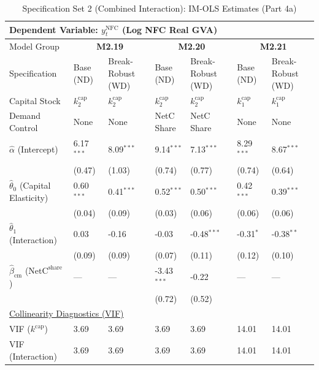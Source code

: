 \begin{table}[H]
\centering
\caption{Specification Set 2 (Combined Interaction): IM-OLS Estimates (Part 4a)}
\label{tab:spec_set_2_p4a}
\scriptsize
\begin{tabular}{p{3.8cm}p{2.1cm}p{2.1cm}p{2.1cm}p{2.1cm}p{2.1cm}p{2.1cm}}
\toprule
\multicolumn{7}{l}{\textbf{Dependent Variable: $y_t^{\text{NFC}}$ (Log NFC Real GVA)}} \\
\midrule
Model Group & \multicolumn{2}{c}{\textbf{M2.19}} & \multicolumn{2}{c}{\textbf{M2.20}} & \multicolumn{2}{c}{\textbf{M2.21}}  \\
Specification & Base (ND) & Break-Robust (WD) & Base (ND) & Break-Robust (WD) & Base (ND) & Break-Robust (WD)  \\
Capital Stock & $k^{\text{cap}}_2$ & $k^{\text{cap}}_2$ & $k^{\text{cap}}_2$ & $k^{\text{cap}}_2$ & $k^{\text{cap}}_1$ & $k^{\text{cap}}_1$  \\
Demand Control & None & None & NetC Share & NetC Share & None & None  \\
\midrule
$\hat{\alpha}$ (Intercept)  & 6.17$^{***}$ & 8.09$^{***}$ & 9.14$^{***}$ & 7.13$^{***}$ & 8.29$^{***}$ & 8.67$^{***}$  \\
 & {\scriptsize (0.47)} & {\scriptsize (1.03)} & {\scriptsize (0.74)} & {\scriptsize (0.77)} & {\scriptsize (0.74)} & {\scriptsize (0.64)}  \\
[1ex]
$\hat{\theta}_0$ (Capital Elasticity)  & 0.60$^{***}$ & 0.41$^{***}$ & 0.52$^{***}$ & 0.50$^{***}$ & 0.42$^{***}$ & 0.39$^{***}$  \\
 & {\scriptsize (0.04)} & {\scriptsize (0.09)} & {\scriptsize (0.03)} & {\scriptsize (0.06)} & {\scriptsize (0.06)} & {\scriptsize (0.06)}  \\
$\hat{\theta}_1$ (Interaction)  & 0.03 & -0.16 & -0.03 & -0.48$^{***}$ & -0.31$^{*}$ & -0.38$^{**}$  \\
 & {\scriptsize (0.09)} & {\scriptsize (0.09)} & {\scriptsize (0.07)} & {\scriptsize (0.11)} & {\scriptsize (0.12)} & {\scriptsize (0.10)}  \\
$\hat{\beta}_{\text{cm}}$ ($\text{NetC}^{\text{share}}$)  & --- & --- & -3.43$^{***}$ & -0.22 & --- & ---  \\
 &  &  & {\scriptsize (0.72)} & {\scriptsize (0.52)} &  &   \\
\midrule
\multicolumn{7}{l}{\underline{Collinearity Diagnostics (VIF)}} \\
VIF ($k^{\text{cap}}$) & 3.69 & 3.69 & 3.69 & 3.69 & 14.01 & 14.01  \\
VIF (Interaction) & 3.69 & 3.69 & 3.69 & 3.69 & 14.01 & 14.01  \\

\end{tabular}
\end{table}
